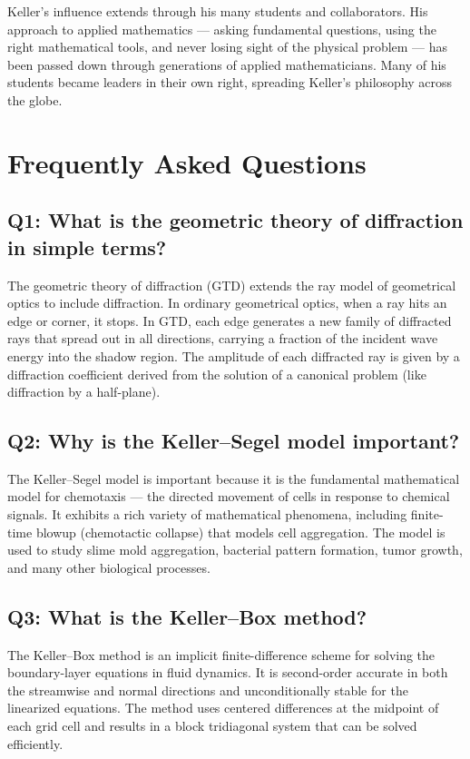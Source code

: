Keller's influence extends through his many students and collaborators. His approach to applied mathematics --- asking fundamental questions, using the right mathematical tools, and never losing sight of the physical problem --- has been passed down through generations of applied mathematicians. Many of his students became leaders in their own right, spreading Keller's philosophy across the globe.

\section{Frequently Asked Questions}

\subsection*{Q1: What is the geometric theory of diffraction in simple terms?}

The geometric theory of diffraction (GTD) extends the ray model of geometrical optics to include diffraction. In ordinary geometrical optics, when a ray hits an edge or corner, it stops. In GTD, each edge generates a new family of diffracted rays that spread out in all directions, carrying a fraction of the incident wave energy into the shadow region. The amplitude of each diffracted ray is given by a diffraction coefficient derived from the solution of a canonical problem (like diffraction by a half-plane).

\subsection*{Q2: Why is the Keller--Segel model important?}

The Keller--Segel model is important because it is the fundamental mathematical model for chemotaxis --- the directed movement of cells in response to chemical signals. It exhibits a rich variety of mathematical phenomena, including finite-time blowup (chemotactic collapse) that models cell aggregation. The model is used to study slime mold aggregation, bacterial pattern formation, tumor growth, and many other biological processes.

\subsection*{Q3: What is the Keller--Box method?}

The Keller--Box method is an implicit finite-difference scheme for solving the boundary-layer equations in fluid dynamics. It is second-order accurate in both the streamwise and normal directions and unconditionally stable for the linearized equations. The method uses centered differences at the midpoint of each grid cell and results in a block tridiagonal system that can be solved efficiently.

